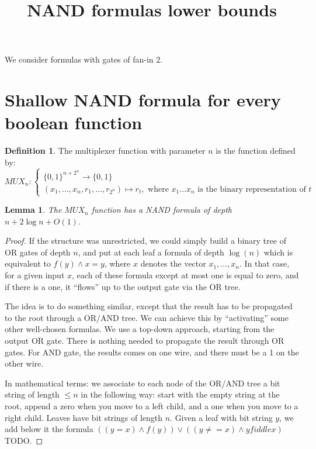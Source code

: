 \documentclass{article}
\title{NAND formulas lower bounds}
\newcommand{\bit}{\{0,1\}}%
\theoremstyle{plain}
\newtheorem{lemma}[theorem]{Lemma}
\theoremstyle{definition}
\newtheorem{definition}[theorem]{Definition}
\begin{document}
\maketitle

We consider formulas with gates of fan-in 2.

\section{Shallow NAND formula for every boolean function}

\begin{definition}
	The multiplexer function with parameter $n$ is
	the function defined by:
	\[MUX_{n}: \begin{cases}
	\bit^{n+2^n} \rightarrow \bit \\
	(x_1,\ldots,x_n, r_1,\ldots, r_{2^n}) \mapsto r_t, \text{ where } x_1\ldots x_n \text{ is the binary representation of } t
	\end{cases}
	\]
\end{definition}

\begin{lemma}\label{lemma:shallow-mux}
	The $MUX_{n}$ function has a NAND formula of depth $n + 2\log n + O(1)$.
\end{lemma}
\begin{proof}
	If the structure was unrestricted, we could simply build a binary tree of OR gates of depth $n$,
	and put at each leaf a formula of depth $\log(n)$ which is equivalent to $f(y) \wedge x = y$,
	where $x$ denotes the vector $x_1,\ldots,x_n$. In that case, for a given input $x$, each of these formula except at most one is equal to zero, and if there is a one, it ``flows'' up to the output gate via the OR tree.

	The idea is to do something similar, except that the result has to be propagated to the root through a OR/AND tree. We can achieve this by ``activating'' some other well-chosen formulas.
	We use a top-down approach, starting from the output OR gate. There is nothing needed to propagate the result through OR gates. For AND gate, the results comes on one wire, and there must be a 1 on the other wire.

	In mathematical terms: we associate to each node of the OR/AND tree a bit string of length $\leq n$ 
	in the following way: 
	start with the empty string at the root, append a zero when you move to a left child, and a one when you move to a right child. Leaves have bit strings of length $n$.
	Given a leaf with bit string $y$, we add below it the formula 
	$((y = x) \wedge f(y)) \vee ((y\neq= x) \wedge y fiddle x)$ TODO.
\end{proof}
\end{document}
